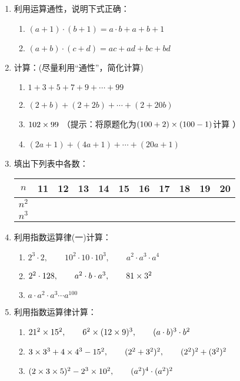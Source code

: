 \begin{enumerate}
	\item 利用运算通性，说明下式正确：
	\begin{enumerate}
		\item $(a+1)\cdot (b+1)=a\cdot b+a+b+1$
		\item $(a+b)\cdot (c+d)=ac+ad+bc+bd$
	\end{enumerate}
	
	\item 计算：(尽量利用“通性”，简化计算)
	\begin{enumerate}
		\item $1+3+5+7+9+\cdots+99$
		\item $(2+b)+(2+2b)+\cdots+(2+20b)$
		\item $102\times 99$ （提示：将原题化为$(100+2)\times(100-1)$计算 ）
		\item $(2a+1)+(4a+1)+\cdots +(20a+1)$
	\end{enumerate}
	
	\item 填出下列表中各数：
	\begin{center}
		\begin{tabular}{c|cccccccccc}
			\hline
			$n$ & 11&12&13&14&15&16&17&18&19&20\\
			\hline
			$n^2$\\
			$n^3$\\
			\hline
		\end{tabular}
	\end{center}
	
	\item 利用指数运算律(一)计算：
	\begin{enumerate}
		\item $2^3\cdot 2,\qquad 10^2\cdot 10\cdot 10^3,\qquad a^2\cdot a^3\cdot a^4$
		\item $2^2\cdot 128,\qquad a^2\cdot b\cdot a^3,\qquad 81\times 3^2$
		\item $a\cdot a^2\cdot a^3\cdots a^{100}$
	\end{enumerate}
	
	\item 利用指数运算律计算：
	\begin{enumerate}
		\item $21^2\times 15^2,\qquad 6^2\times(12\times 9)^3,\qquad (a\cdot b)^3\cdot b^2$
		\item $3\times 3^3+4\times 4^3-15^2,\qquad (2^2+3^2)^2,\qquad (2^2)^2+(3^2)^2$
		\item $(2\times3\times5)^2-2^3\times10^2,\qquad (a^2)^4\cdot (a^2)^2$
	\end{enumerate}
	

\end{enumerate}
